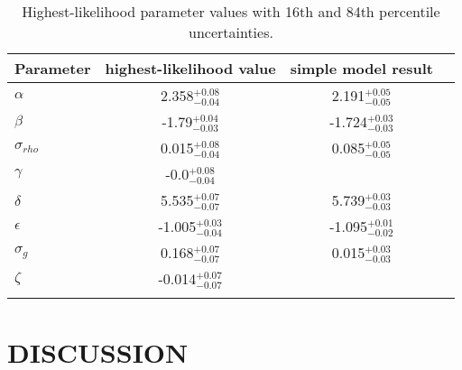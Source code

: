 \documentclass[apjl]{emulateapj}
\begin{document}
\begin{table}
\caption{Highest-likelihood parameter values with 16th and 84th
	percentile uncertainties.}
\begin{tabular}{lccc}
\hline\hline
Parameter & highest-likelihood value & simple model result \\
    \hline
$\alpha$ &    2.358$_{-0.04}^{+0.08}$ &       2.191$_{-0.05}^{+0.05}$  \\
$\beta$ &    -1.79$_{-0.03}^{+0.04}$ &        -1.724$_{-0.03}^{+0.03}$ \\
$\sigma_{rho}$ &    0.015$_{-0.04}^{+0.08}$ &   0.085$_{-0.05}^{+0.05}$  \\
$\gamma$ &    -0.0$_{-0.04}^{+0.08}$ & \\
$\delta$ &    5.535$_{-0.07}^{+0.07}$ &      5.739$_{-0.03}^{+0.03}$  \\
$\epsilon$ &    -1.005$_{-0.04}^{+0.03}$ &   -1.095$_{-0.02}^{+0.01}$ \\
$\sigma_g$ &    0.168$_{-0.07}^{+0.07}$ &    0.015$_{-0.03}^{+0.03}$  \\
$\zeta$ &    -0.014$_{-0.07}^{+0.07}$ & \\
    \hline
\label{tab:results}
\end{tabular}
\end{table}

\section{DISCUSSION}
\label{sec:discussion}

\end{document}
